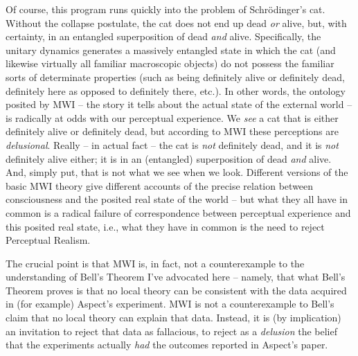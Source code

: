 \documentclass[12pt]{article}
\begin{document}
Of course, this program runs quickly into the problem of
Schr\"odinger's cat.  Without the collapse postulate, the cat does not
end up dead \emph{or} alive, but, with certainty, in an entangled
superposition of dead \emph{and}
alive.  Specifically, the unitary dynamics generates a massively
entangled state in which the cat (and likewise virtually all familiar
macroscopic objects) do not possess the familiar sorts of determinate
properties (such as being definitely alive or definitely dead,
definitely here as opposed to definitely there, etc.).  In other
words, the ontology posited by MWI -- the story it tells about the
actual state of the external world -- is radically at odds with our
perceptual experience.  We \emph{see} a cat that is either definitely
alive or definitely dead, but according to MWI these perceptions are
\emph{delusional}.  Really -- in actual fact -- the cat is \emph{not}
definitely dead, and it is \emph{not} definitely alive either; it is
in an (entangled) superposition of dead \emph{and} alive.  And, simply
put, that is not what we see when we look.  Different versions of the
basic MWI theory 
\cite{albertmwi}
give different accounts of the precise relation
between consciousness and the posited real state of the world -- but what they
all have in common is a radical failure of correspondence between
perceptual experience and this posited real state, i.e., what they have in
common is the need to reject Perceptual Realism.

The crucial point is that MWI is, in fact, not a counterexample to the
understanding of Bell's Theorem I've advocated here -- namely, that
what Bell's Theorem proves is that no local theory can be
consistent with the data acquired in (for example) Aspect's
experiment.  MWI is not a counterexample to Bell's claim that no
local theory can explain that data.  Instead, it is (by implication) 
an invitation to reject that data as fallacious, to reject 
as a \emph{delusion} the belief that the experiments actually 
\emph{had} the outcomes reported in Aspect's paper.  
\end{document}
